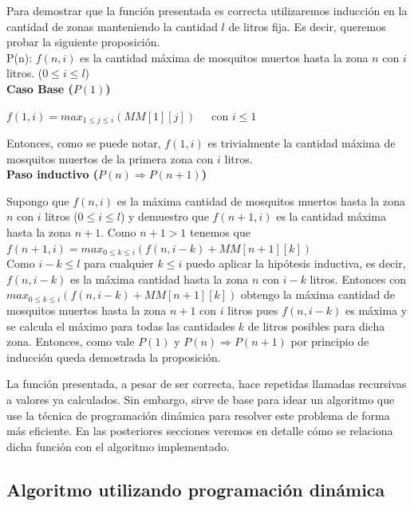 \documentclass[a4paper,11pt] {article}
\begin{document}
Para demostrar que la funci\'on presentada es correcta utilizaremos inducci\'on en la cantidad de zonas manteniendo la cantidad $l$ de litros fija. Es decir, queremos probar la siguiente proposición. \\

P(n): $f(n, i)$ es la cantidad máxima de mosquitos muertos hasta la zona $n$ con $i$ litros. ($0 \leq i \leq l$) \\

\textbf{Caso Base ($P(1)$)}

$f(1,i) = max_{1 \leq j \leq i} (MM[1][j]) \;\;\;\; $ con $i \leq 1$

Entonces, como se puede notar, $f(1,i)$ es trivialmente la cantidad máxima de mosquitos muertos de la primera zona con $i$ litros. \\

\textbf{Paso inductivo ($P(n) \Rightarrow P(n+1)$)}

Supongo que $f(n,i)$ es la máxima cantidad de mosquitos muertos hasta la zona $n$ con $i$ litros ($0 \leq i \leq l$) y demuestro que $f(n+1,i)$ es la cantidad máxima hasta la zona $n+1$.
Como $n+1 > 1$ tenemos que \\

$f(n+1,i) = max_{0 \leq k \leq i} (f(n, i-k) + MM[n+1][k])$ \\

Como $i - k \leq l$ para cualquier $k \leq i$ puedo aplicar la hipótesis inductiva, es decir, $f(n,i-k)$ es la máxima cantidad hasta la zona $n$ con $i-k$ litros. Entonces con $max_{0 \leq k \leq i} (f(n, i-k) + MM[n+1][k])$ obtengo la máxima cantidad de mosquitos muertos hasta la zona $n+1$ con $i$ litros pues $f(n,i-k)$ es máxima y se calcula el máximo para todas las cantidades $k$ de litros posibles para dicha zona. Entonces, como vale $P(1)$ y $P(n) \Rightarrow P(n+1)$ por principio de inducci\'on queda demostrada la proposici\'on.

La función presentada, a pesar de ser correcta, hace repetidas llamadas recursivas a valores ya calculados. Sin embargo, sirve de base para idear un algoritmo que use la técnica de programación dinámica para resolver este problema de forma más eficiente. En las posteriores secciones veremos en detalle cómo se relaciona dicha función con el algoritmo implementado.

\subsection*{Algoritmo utilizando programación dinámica}
\end{document}
